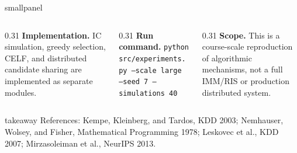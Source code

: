 \documentclass[final]{beamer}
\begin{document}
\begin{frame}[t]
\vspace{0.60cm}
\begin{beamercolorbox}[wd=\textwidth,sep=0.42cm,rounded=true]{smallpanel}
  \begin{columns}[T,totalwidth=\textwidth]
    \begin{column}{0.31\textwidth}
      \textbf{Implementation.}
      IC simulation, greedy selection, CELF, and distributed candidate sharing are implemented as separate modules.
    \end{column}
    \begin{column}{0.31\textwidth}
      \textbf{Run command.}
      \texttt{python src/experiments.py --scale large --seed 7 --simulations 40}
    \end{column}
    \begin{column}{0.31\textwidth}
      \textbf{Scope.}
      This is a course-scale reproduction of algorithmic mechanisms, not a full IMM/RIS or production distributed system.
    \end{column}
  \end{columns}
\end{beamercolorbox}

\vspace{0.26cm}
\begin{beamercolorbox}[wd=\textwidth,sep=0.28cm,rounded=true]{takeaway}
  \centering
  {\scriptsize References: Kempe, Kleinberg, and Tardos, KDD 2003; Nemhauser, Wolsey, and Fisher, Mathematical Programming 1978; Leskovec et al., KDD 2007; Mirzasoleiman et al., NeurIPS 2013.}
\end{beamercolorbox}

\end{frame}
\end{document}
